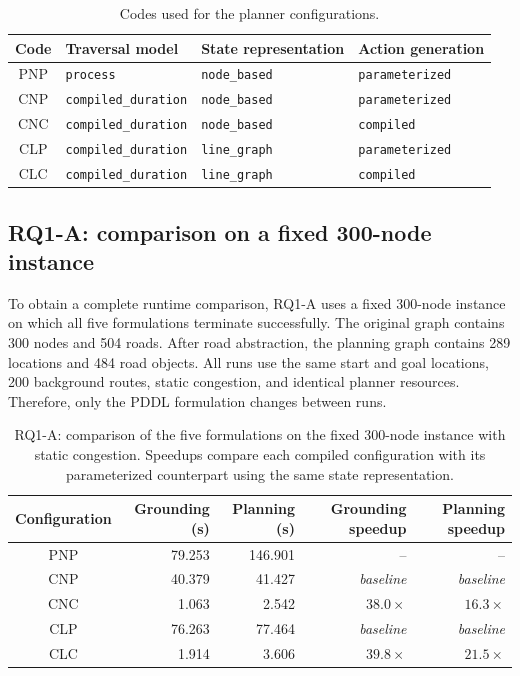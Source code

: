 \documentclass[10pt]{article}
\begin{document}
\begin{table}[H]
\centering
\caption{Codes used for the planner configurations.}
\label{tab:planner-codes}
\scriptsize

\begin{tabular}{@{}c l l l@{}}
\toprule
Code & Traversal model & State representation & Action generation \\
\midrule
PNP & \texttt{process}            & \texttt{node\_based} & \texttt{parameterized} \\
CNP & \texttt{compiled\_duration} & \texttt{node\_based} & \texttt{parameterized} \\
CNC & \texttt{compiled\_duration} & \texttt{node\_based} & \texttt{compiled} \\
CLP & \texttt{compiled\_duration} & \texttt{line\_graph} & \texttt{parameterized} \\
CLC & \texttt{compiled\_duration} & \texttt{line\_graph} & \texttt{compiled} \\
\bottomrule
\end{tabular}
\end{table}


\subsection{RQ1-A: comparison on a fixed 300-node instance}

To obtain a complete runtime comparison, RQ1-A uses a fixed 300-node
instance on which all five formulations terminate successfully. The
original graph contains 300 nodes and 504 roads. After road abstraction,
the planning graph contains 289 locations and 484 road objects. All runs
use the same start and goal locations, 200 background routes, static
congestion, and identical planner resources. Therefore, only the PDDL
formulation changes between runs.



\begin{table}[H]
\centering
\caption{RQ1-A: comparison of the five formulations on the fixed
300-node instance with static congestion. Speedups compare each compiled
configuration with its parameterized counterpart using the same state
representation.}
\label{tab:rq1-a}
\scriptsize
\begin{tabular}{@{}c r r r r@{}}
\toprule
Configuration
& Grounding (s)
& Planning (s)
& Grounding speedup
& Planning speedup \\
\midrule
PNP & 79.253 & 146.901 & --              & --              \\
CNP & 40.379 & 41.427  & \textit{baseline} & \textit{baseline} \\
CNC & 1.063  & 2.542   & $38.0\times$    & $16.3\times$    \\
CLP & 76.263 & 77.464  & \textit{baseline} & \textit{baseline} \\
CLC & 1.914  & 3.606   & $39.8\times$    & $21.5\times$    \\
\bottomrule
\end{tabular}
\end{table}
\end{document}
